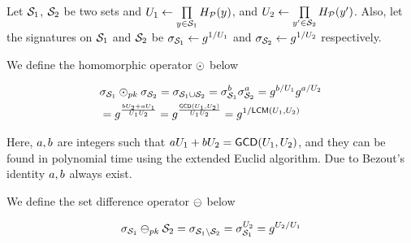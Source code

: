 Let  $\genericSetVar[1]$, $\genericSetVar[2]$ be two sets and $\accSet[1] \gets 
\prod\limits_{\genericCInputElmt \in \genericSetVar[1]} \primeRO(\genericCInputElmt)$, and $\accSet[2] \gets 
\prod\limits_{\genericCInputElmt' \in \genericSetVar[2]}  \primeRO(\genericCInputElmt')$. Also, let the signatures on $\genericSetVar[1]$ and $\genericSetVar[2]$ be $\genericSig[\genericSetVar[1]] \assign \qrGen^{1/\accSet[1]}$ and $\genericSig[\genericSetVar[2]] \assign \qrGen^{1/\accSet[2]}$ respectively. %


\itemListStart
\item {} We define the homomorphic operator $\sigHomomorphism$ below


\begin{align*}
& \genericSig[\genericSetVar[1]] \sigHomomorphism[\pubKey] \genericSig[\genericSetVar[2]] = \genericSig[\genericSetVar[1] \cup \genericSetVar[2]] = 
\genericSig[\genericSetVar[1]]^{\euclideanConst[2]}  \genericSig[\genericSetVar[2]]^{\euclideanConst[1]} = \qrGen^{\euclideanConst[2]/\accSet[1]} \qrGen^{\euclideanConst[1]/\accSet[2]} \\
&  = \qrGen^{\frac{\euclideanConst[2] \accSet[2] + \euclideanConst[1] \accSet[1]}{\accSet[1] \accSet[2]}} =\qrGen^{\frac{\gcd(\accSet[1], \accSet[2])}{\accSet[1] \accSet[2]}} = \qrGen^{1/\lcm(\accSet[1], \accSet[2])} \label{eq}
\end{align*}


Here, $\euclideanConst[1], \euclideanConst[2]$ are integers such that $\euclideanConst[1]\accSet[1] + \euclideanConst[2] \accSet[2] = \gcd(\accSet[1], \accSet[2])$, and they can be found in polynomial time using the extended Euclid algorithm. Due to Bezout's identity $\euclideanConst[1], \euclideanConst[2]$ always exist. 








\item {} We define the set difference operator $\sigMinus$ below

\[
\genericSig[\genericSetVar[1]] \sigMinus[\pubKey] \genericSetVar[2] = \genericSig[\genericSetVar[1] \setminus \genericSetVar[2]] = \genericSig[\genericSetVar[1]]^{\accSet[2]} = \qrGen^{\accSet[2]/\accSet[1]}
\]

